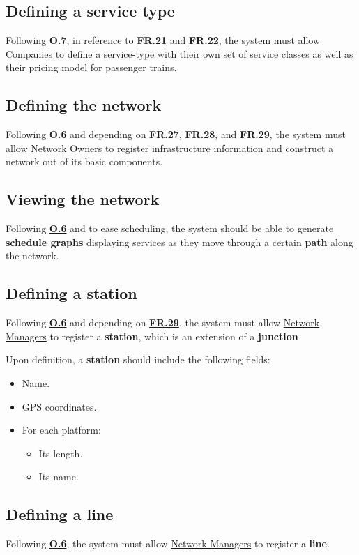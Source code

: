 \documentclass[12pt]{article}
\renewcommand\bf[1]{\textbf{#1}}
\newcommand\un[1]{\underline{#1}}
\newcommand\hyl[1]{\hyperref[#1]{\bf{#1}}}
\begin{document}
\subsection{Defining a service type} \label{FR.23}
Following \hyl{O.7}, in reference to \hyl{FR.21} and \hyl{FR.22}, the system must allow \un{Companies} to define a service-type with their own set of service classes as well as their pricing model for passenger trains.

\subsection{Defining the network} \label{FR.24}
Following \hyl{O.6} and depending on \hyl{FR.27}, \hyl{FR.28}, and \hyl{FR.29}, the system must allow \un{Network Owners} to register infrastructure information and construct a network out of its basic components.

\subsection{Viewing the network} \label{FR.25}
Following \hyl{O.6} and to ease scheduling, the system should be able to generate \bf{schedule graphs} displaying services as they move through a certain \bf{path} along the network.

\subsection{Defining a station} \label{FR.26}
Following \hyl{O.6} and depending on \hyl{FR.29}, the system must allow \un{Network Managers} to register a \bf{station}, which is an extension of a \bf{junction}

Upon definition, a \bf{station} should include the following fields:
\begin{itemize}
	\item Name.
	\item GPS coordinates.
	\item For each platform:
	\begin{itemize}
		\item Its length.
		\item Its name.
	\end{itemize}
\end{itemize}

\subsection{Defining a line} \label{FR.27}
Following \hyl{O.6}, the system must allow \un{Network Managers} to register a \bf{line}.
\end{document}
